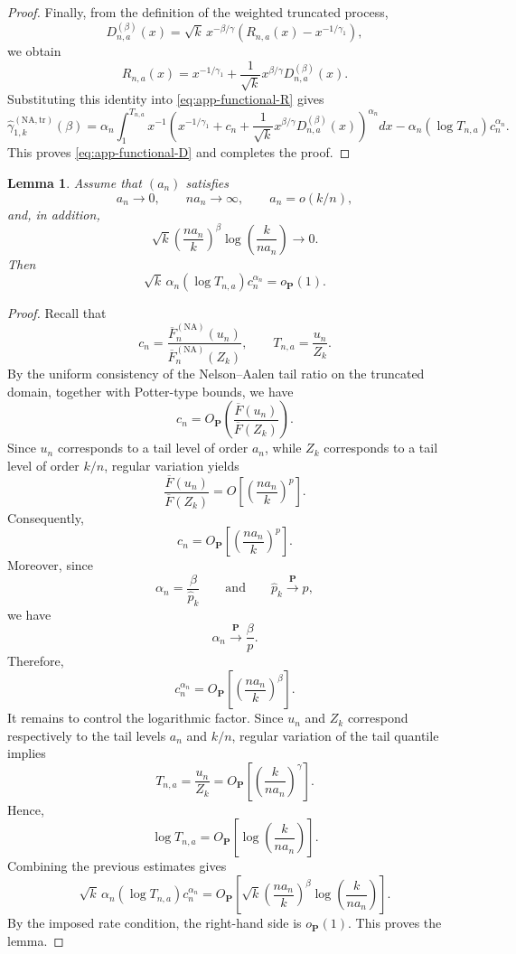 \documentclass[reqno,openbib,runningheads,a4paper,12pt]{amsart}%
\newtheorem{lemma}{Lemma}[section]
\begin{document}
\begin{proof}
\noindent Finally, from the definition of the weighted truncated process,
\[
D_{n,a}^{(\beta)}(x) = \sqrt{k}\,x^{-\beta/\gamma} \left(  R_{n,a}%
(x)-x^{-1/\gamma_{1}}\right)  ,
\]
we obtain
\[
R_{n,a}(x) = x^{-1/\gamma_{1}} + \frac{1}{\sqrt{k}}x^{\beta/\gamma}%
D_{n,a}^{(\beta)}(x).
\]
Substituting this identity into \eqref{eq:app-functional-R} gives
\[
\widehat{\gamma}_{1,k}^{(\mathrm{NA,tr})}(\beta) = \alpha_{n} \int%
_{1}^{T_{n,a}} x^{-1} \left(  x^{-1/\gamma_{1}} + c_{n} + \frac{1}{\sqrt{k}%
}x^{\beta/\gamma}D_{n,a}^{(\beta)}(x) \right)  ^{\alpha_{n}}dx - \alpha
_{n}(\log T_{n,a})c_{n}^{\alpha_{n}}.
\]
This proves \eqref{eq:app-functional-D} and completes the proof.
\end{proof}

\begin{lemma}
\label{lem:boundary-truncation} Assume that $(a_{n})$ satisfies
\[
a_{n}\to0,\qquad na_{n}\to\infty,\qquad a_{n}=o(k/n),
\]
and, in addition,
\[
\sqrt{k} \left(  \frac{na_{n}}{k}\right)  ^{\beta} \log\!\left(  \frac
{k}{na_{n}}\right)  \to0.
\]
Then
\[
\sqrt{k}\,\alpha_{n}(\log T_{n,a})c_{n}^{\alpha_{n}} = o_{\mathbf{P}}(1).
\]

\end{lemma}

\begin{proof}
Recall that
\[
c_{n}=\frac{\overline{F}_{n}^{(\mathrm{NA})}(u_{n})}{\overline{F}%
_{n}^{(\mathrm{NA})}(Z_{k})},\qquad T_{n,a}=\frac{u_{n}}{Z_{k}}.
\]
By the uniform consistency of the Nelson--Aalen tail ratio on the truncated
domain, together with Potter-type bounds, we have
\[
c_{n}=O_{\mathbf{P}}\!\left(  \frac{\overline{F}(u_{n})}{\overline{F}(Z_{k}%
)}\right)  .
\]
Since $u_{n}$ corresponds to a tail level of order $a_{n}$, while $Z_{k}$
corresponds to a tail level of order $k/n$, regular variation yields
\[
\frac{\overline{F}(u_{n})}{\overline{F}(Z_{k})}=O\!\left[  \left(
\frac{na_{n}}{k}\right)  ^{p}\right]  .
\]
Consequently,
\[
c_{n}=O_{\mathbf{P}}\!\left[  \left(  \frac{na_{n}}{k}\right)  ^{p}\right]  .
\]
Moreover, since
\[
\alpha_{n}=\frac{\beta}{\widehat{p}_{k}}\qquad\text{and}\qquad\widehat{p}%
_{k}\overset{\mathbf{P}}{\longrightarrow}p,
\]
we have
\[
\alpha_{n}\overset{\mathbf{P}}{\longrightarrow}\frac{\beta}{p}.
\]
Therefore,
\[
c_{n}^{\alpha_{n}}=O_{\mathbf{P}}\!\left[  \left(  \frac{na_{n}}{k}\right)
^{\beta}\right]  .
\]
It remains to control the logarithmic factor. Since $u_{n}$ and $Z_{k}$
correspond respectively to the tail levels $a_{n}$ and $k/n$, regular
variation of the tail quantile implies
\[
T_{n,a}=\frac{u_{n}}{Z_{k}}=O_{\mathbf{P}}\!\left[  \left(  \frac{k}{na_{n}%
}\right)  ^{\gamma}\right]  .
\]
Hence,
\[
\log T_{n,a}=O_{\mathbf{P}}\!\left[  \log\!\left(  \frac{k}{na_{n}}\right)
\right]  .
\]
Combining the previous estimates gives
\[
\sqrt{k}\,\alpha_{n}(\log T_{n,a})c_{n}^{\alpha_{n}}=O_{\mathbf{P}}\!\left[
\sqrt{k}\left(  \frac{na_{n}}{k}\right)  ^{\beta}\log\!\left(  \frac{k}%
{na_{n}}\right)  \right]  .
\]
By the imposed rate condition, the right-hand side is $o_{\mathbf{P}}(1)$.
This proves the lemma.
\end{proof}
\end{document}
